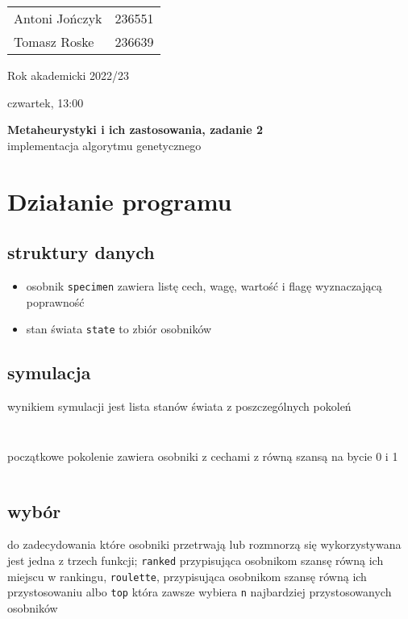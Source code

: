 \documentclass{article}
\newcommand{\cljt}[1]{\texttt{#1}}
\begin{document}
\begin{minipage}{0.35\linewidth}
	\begin{tabular}{lr}
		Antoni Jończyk & 236551 \\
		Tomasz Roske   & 236639
	\end{tabular} \hfill
\end{minipage}
\hfill
\begin{minipage}{0.35\linewidth}
	\hfill Rok akademicki 2022/23 \par
	\hfill czwartek, 13:00
\end{minipage}
\bigskip \bigskip \bigskip \bigskip \bigskip
\begin{center}
	\textbf{Metaheurystyki i ich zastosowania, zadanie 2}\\
	\bigskip
	\large implementacja algorytmu genetycznego
\end{center}
\bigskip \bigskip
\section{Działanie programu}

\subsection{struktury danych}
\begin{itemize}
	\item osobnik \cljt{specimen} zawiera listę cech, wagę, wartość i flagę
	      wyznaczającą poprawność
	\item stan świata \cljt{state} to zbiór osobników
\end{itemize}
\subsection{symulacja}
wynikiem symulacji jest lista stanów świata z poszczególnych pokoleń
\inputminted{clojure}{snippets/alg.clj_simulate}
\inputminted{clojure}{snippets/alg.clj_advance}
początkowe pokolenie zawiera osobniki z cechami z równą szansą na bycie 0 i 1
\inputminted{clojure}{snippets/alg.clj_orphan}

\subsection{wybór}
do zadecydowania które osobniki przetrwają lub rozmnorzą się wykorzystywana jest
jedna z trzech funkcji; \cljt{ranked} przypisująca osobnikom szansę równą ich
miejscu w rankingu, \cljt{roulette}, przypisująca osobnikom szansę równą ich
przystosowaniu  albo \cljt{top} która zawsze wybiera \cljt{n} najbardziej
przystosowanych osobników
\inputminted{clojure}{snippets/alg.clj_top}
\end{document}
